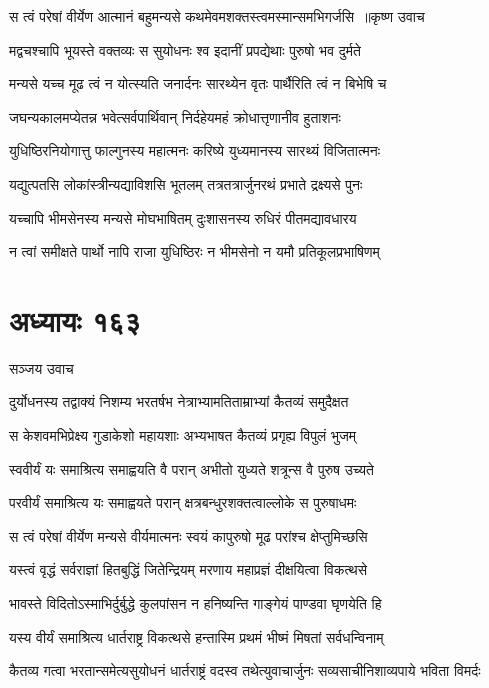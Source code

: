 \threelineshloka
{स त्वं परेषां वीर्येण आत्मानं बहुमन्यसे}
{कथमेवमशक्तस्त्वमस्मान्समभिगर्जसि ॥कृष्ण उवाच}
{}


\twolineshloka
{मद्वचश्चापि भूयस्ते वक्तव्यः स सुयोधनः}
{श्व इदानीं प्रपद्येथाः पुरुषो भव दुर्मते}


\twolineshloka
{मन्यसे यच्च मूढ त्वं न योत्स्यति जनार्दनः}
{सारथ्येन वृतः पार्थैरिति त्वं न बिभेषि च}


\twolineshloka
{जघन्यकालमप्येतन्न भवेत्सर्वपार्थिवान्}
{निर्दहेयमहं क्रोधात्तृणानीव हुताशनः}


\twolineshloka
{युधिष्ठिरनियोगात्तु फाल्गुनस्य महात्मनः}
{करिष्ये युध्यमानस्य सारथ्यं विजितात्मनः}


\twolineshloka
{यद्युत्पतसि लोकांस्त्रीन्यद्याविशसि भूतलम्}
{तत्रतत्रार्जुनरथं प्रभाते द्रक्ष्यसे पुनः}


\twolineshloka
{यच्चापि भीमसेनस्य मन्यसे मोघभाषितम्}
{दुःशासनस्य रुधिरं पीतमद्यावधारय}


\twolineshloka
{न त्वां समीक्षते पार्थो नापि राजा युधिष्ठिरः}
{न भीमसेनो न यमौ प्रतिकूलप्रभाषिणम्}


\chapter{अध्यायः १६३}
\twolineshloka
{सञ्जय उवाच}
{}


\twolineshloka
{दुर्योधनस्य तद्वाक्यं निशम्य भरतर्षभ}
{नेत्राभ्यामतिताम्राभ्यां कैतव्यं समुदैक्षत}


\twolineshloka
{स केशवमभिप्रेक्ष्य गुडाकेशो महायशाः}
{अभ्यभाषत कैतव्यं प्रगृह्य विपुलं भुजम्}


\twolineshloka
{स्ववीर्यं यः समाश्रित्य समाह्वयति वै परान्}
{अभीतो युध्यते शत्रून्स वै पुरुष उच्यते}


\twolineshloka
{परवीर्यं समाश्रित्य यः समाह्वयते परान्}
{क्षत्रबन्धुरशक्तत्वाल्लोके स पुरुषाधमः}


\twolineshloka
{स त्वं परेषां वीर्येण मन्यसे वीर्यमात्मनः}
{स्वयं कापुरुषो मूढ परांश्च क्षेप्तुमिच्छसि}


\twolineshloka
{यस्त्वं वृद्धं सर्वराज्ञां हितबुद्धिं जितेन्द्रियम्}
{मरणाय महाप्रज्ञं दीक्षयित्वा विकत्थसे}


\twolineshloka
{भावस्ते विदितोऽस्माभिर्दुर्बुद्धे कुलपांसन}
{न हनिष्यन्ति गाङ्गेयं पाण्डवा घृणयेति हि}


\threelineshloka
{यस्य वीर्यं समाश्रित्य धार्तराष्ट्र विकत्थसे}
{हन्तास्मि प्रथमं भीष्मं मिषतां सर्वधन्विनाम्}
{}


\twolineshloka
{कैतव्य गत्वा भरतान्समेत्यसुयोधनं धार्तराष्ट्रं वदस्व}
{तथेत्युवाचार्जुनः सव्यसाचीनिशाव्यपाये भविता विमर्दः}


